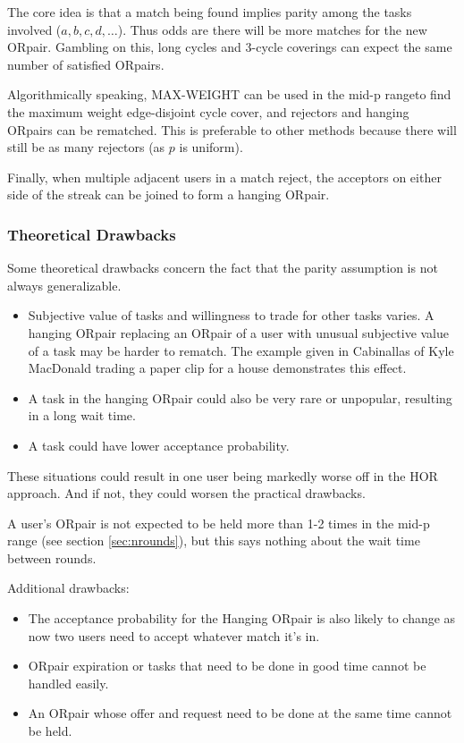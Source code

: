 \documentclass[main.tex]{subfiles}
\begin{document}
The core idea is that a match being found implies parity among the tasks involved ($a, b, c, d, \dots$). Thus odds are there will be more matches for the new ORpair. Gambling on this, long cycles and 3-cycle coverings can expect the same number of satisfied ORpairs.

Algorithmically speaking, MAX-WEIGHT can be used in the mid-p rangeto find the maximum weight edge-disjoint cycle cover, and rejectors and hanging ORpairs can be rematched. This is preferable to other methods because there will still be as many rejectors (as $p$ is uniform).

Finally, when multiple adjacent users in a match reject, the acceptors on either side of the streak can be joined to form a hanging ORpair.

\subsubsection{Theoretical Drawbacks}\label{sec:theoretical drawbacks}
Some theoretical drawbacks concern the fact that the parity assumption is not always generalizable.

\begin{itemize}
  \item Subjective value of tasks and willingness to trade for other tasks varies. A hanging ORpair replacing an ORpair of a user with unusual subjective value of a task may be harder to rematch. The example given in Cabinallas \cite{Cab0} of Kyle MacDonald trading a paper clip for a house demonstrates this effect.
  \item A task in the hanging ORpair could also be very rare or unpopular, resulting in a long wait time.
  \item A task could have lower acceptance probability.
\end{itemize}

These situations could result in one user being markedly worse off in the HOR approach. And if not, they could worsen the practical drawbacks.

A user's ORpair is not expected to be held more than 1-2 times in the mid-p range (see section \ref{sec:nrounds}), but this says nothing about the wait time between rounds.

Additional drawbacks:
\begin{itemize}
  \item The acceptance probability for the Hanging ORpair is also likely to change as now two users need to accept whatever match it's in.
  \item ORpair expiration or tasks that need to be done in good time cannot be handled easily.
  \item An ORpair whose offer and request need to be done at the same time cannot be held.
\end{itemize}
\end{document}
